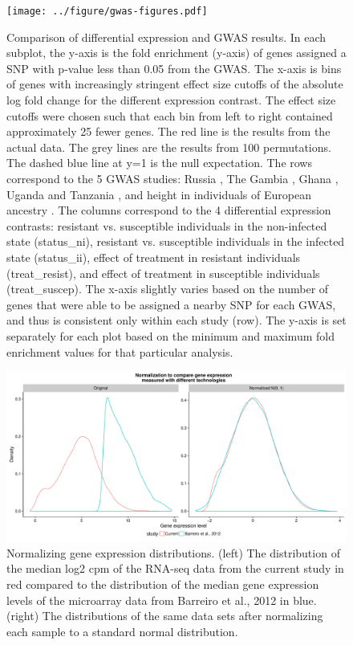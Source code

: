 \documentclass[fleqn,10pt]{wlscirep}
\begin{document}
\begin{figure}[ht]
\centering
\texttt{[image: ../figure/gwas-figures.pdf]}
\caption{
Comparison of differential expression and GWAS results. In each
subplot, the y-axis is the fold enrichment (y-axis) of genes assigned
a SNP with p-value less than 0.05 from the GWAS. The x-axis is bins of
genes with increasingly stringent effect size cutoffs of the absolute
log fold change for the different expression contrast. The effect size
cutoffs were chosen such that each bin from left to right contained
approximately 25 fewer genes. The red line is the results from the
actual data. The grey lines are the results from 100 permutations. The
dashed blue line at y=1 is the null expectation. The rows correspond
to the 5 GWAS studies: Russia \cite{Curtis2015}, The Gambia
\cite{Thye2010}, Ghana \cite{Thye2010}, Uganda and Tanzania
\cite{Sobota2016}, and height in individuals of European ancestry
\cite{LangoAllen2010}. The columns correspond to the 4 differential
expression contrasts: resistant vs. susceptible individuals in the
non-infected state (status\_ni), resistant vs. susceptible individuals
in the infected state (status\_ii), effect of treatment in resistant
individuals (treat\_resist), and effect of treatment in susceptible
individuals (treat\_suscep). The x-axis slightly varies based on the
number of genes that were able to be assigned a nearby SNP for each
GWAS, and thus is consistent only within each study (row). The y-axis
is set separately for each plot based on the minimum and maximum fold
enrichment values for that particular analysis.
}
\label{fig:gwas-supp}
\end{figure}

\begin{figure}[ht]
\centering
\includegraphics[width=\linewidth]{../figure/combined-distributions.pdf}
\caption{
Normalizing gene expression distributions. (left) The distribution of
the median log2 cpm of the RNA-seq data from the current study in red
compared to the distribution of the median gene expression levels of
the microarray data from Barreiro et al., 2012 \cite{Barreiro2012} in
blue. (right) The distributions of the same data sets after
normalizing each sample to a standard normal distribution.
}
\label{fig:combined-dist}
\end{figure}
\end{document}
